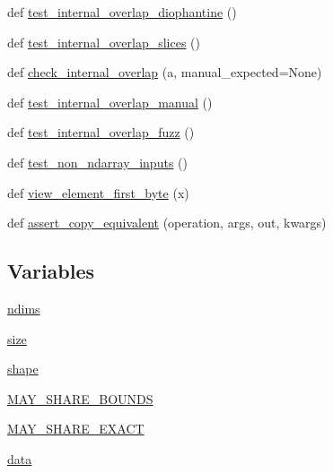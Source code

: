 \begin{DoxyCompactItemize}
def \hyperlink{namespacenumpy_1_1core_1_1tests_1_1test__mem__overlap_abf112ec22ac91ff5e329c123e7d0011b}{test\+\_\+internal\+\_\+overlap\+\_\+diophantine} ()
\item 
def \hyperlink{namespacenumpy_1_1core_1_1tests_1_1test__mem__overlap_a7b474fd55a875cb48911d975815430c2}{test\+\_\+internal\+\_\+overlap\+\_\+slices} ()
\item 
def \hyperlink{namespacenumpy_1_1core_1_1tests_1_1test__mem__overlap_a72fe8c3adbf8b37c12aecfcc6d0b19a7}{check\+\_\+internal\+\_\+overlap} (a, manual\+\_\+expected=None)
\item 
def \hyperlink{namespacenumpy_1_1core_1_1tests_1_1test__mem__overlap_aab77c6eeb8781044e8b01bfd17ef1e7b}{test\+\_\+internal\+\_\+overlap\+\_\+manual} ()
\item 
def \hyperlink{namespacenumpy_1_1core_1_1tests_1_1test__mem__overlap_afdf1ab65d494259c1182058e93c8a40d}{test\+\_\+internal\+\_\+overlap\+\_\+fuzz} ()
\item 
def \hyperlink{namespacenumpy_1_1core_1_1tests_1_1test__mem__overlap_a72a1ec28071695185788f94215de7f0a}{test\+\_\+non\+\_\+ndarray\+\_\+inputs} ()
\item 
def \hyperlink{namespacenumpy_1_1core_1_1tests_1_1test__mem__overlap_af9589bfb3047c5b808b9f51288c5dea1}{view\+\_\+element\+\_\+first\+\_\+byte} (x)
\item 
def \hyperlink{namespacenumpy_1_1core_1_1tests_1_1test__mem__overlap_a21999d841efdb1541554a96a55ad67a0}{assert\+\_\+copy\+\_\+equivalent} (operation, args, out, kwargs)
\end{DoxyCompactItemize}
\subsection*{Variables}
\begin{DoxyCompactItemize}
\item 
\hyperlink{namespacenumpy_1_1core_1_1tests_1_1test__mem__overlap_afac5e1c41225f46e0314511659c3686e}{ndims}
\item 
\hyperlink{namespacenumpy_1_1core_1_1tests_1_1test__mem__overlap_a2e0a72f57b0814d3e92174d03edafe12}{size}
\item 
\hyperlink{namespacenumpy_1_1core_1_1tests_1_1test__mem__overlap_aa6e7c741bc74fe28474c69b91e53329c}{shape}
\item 
\hyperlink{namespacenumpy_1_1core_1_1tests_1_1test__mem__overlap_a5b456ea99db1d912a18a21667174cc0b}{M\+A\+Y\+\_\+\+S\+H\+A\+R\+E\+\_\+\+B\+O\+U\+N\+DS}
\item 
\hyperlink{namespacenumpy_1_1core_1_1tests_1_1test__mem__overlap_a10840d2db4fe4c6cf22efca7a5ab32a2}{M\+A\+Y\+\_\+\+S\+H\+A\+R\+E\+\_\+\+E\+X\+A\+CT}
\item 
\hyperlink{namespacenumpy_1_1core_1_1tests_1_1test__mem__overlap_a9fee9cb127e319079047d2b16e19c3e1}{data}
\end{DoxyCompactItemize}


